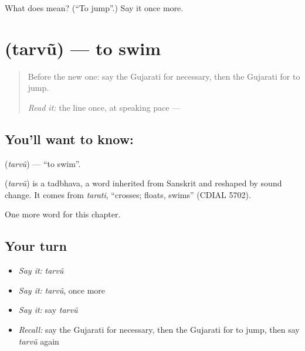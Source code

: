 \begin{tcolorbox}[breakable,colback=teal!4,colframe=teal!35!black,title={Before you move on}]
What does  mean? (\textquotedblleft{}To jump\textquotedblright{}.) Say it once more.
\end{tcolorbox}
\section[\texorpdfstring{\gu{તરવું} (tarvũ)}{તરવું (tarvũ)}]{ (tarvũ) — to swim}

\label{lesson:GU-C138-tarvu}



\begin{quote}
Before the new one: say the Gujarati for necessary, then the Gujarati for to jump.

\emph{Read it:} the line once, at speaking pace — \textbf{   }
\end{quote}

\subsection*{You'll want to know: }
\textbf{} (\emph{tarvũ}) — \textquotedblleft{}to swim\textquotedblright{}.

\begin{cousinweb}
\textbf{} (\emph{tarvũ}) is a tadbhava, a word inherited from Sanskrit and reshaped by sound change. It comes from \emph{tarati}, \textquotedblleft{}crosses; floats, swims\textquotedblright{} (CDIAL 5702).
\end{cousinweb}

\begin{grammarlens}[title={What you've built}]
One more word for this chapter.
\end{grammarlens}

\subsection*{Your turn}
\begin{itemize}
\raggedright
  \item \emph{Say it:} \emph{tarvũ}
  \item \emph{Say it:} \emph{tarvũ}, once more
  \item \emph{Say it:} say \emph{tarvũ}
  \item \emph{Recall:} say the Gujarati for necessary, then the Gujarati for to jump, then say \emph{tarvũ} again
\end{itemize}

